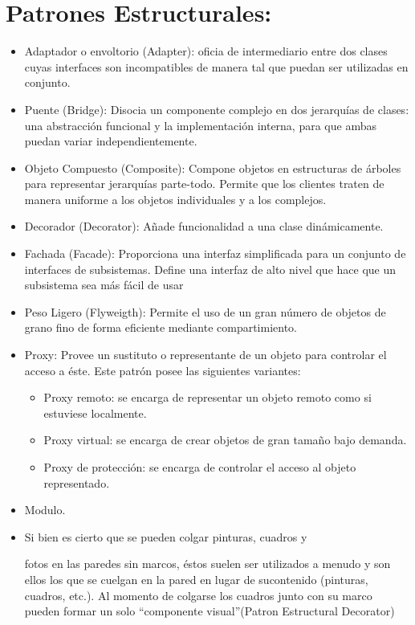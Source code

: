 \documentclass[10pt]{article}
\begin{document}
\section{Patrones Estructurales:}
\begin{itemize}


\item Adaptador o envoltorio (Adapter): oficia de intermediario entre dos clases cuyas interfaces 
son incompatibles de manera tal que puedan ser utilizadas en 
conjunto. 
\item Puente (Bridge): Disocia un componente complejo en dos jerarquías de 
clases: una abstracción funcional y la implementación interna, para 
que ambas puedan variar independientemente.
\item Objeto Compuesto (Composite): Compone objetos en estructuras de árboles para 
representar jerarquías parte-todo. Permite que los clientes traten de 
manera uniforme a los objetos individuales y a los complejos. 
\item Decorador (Decorator): Añade funcionalidad a una clase dinámicamente.
\item Fachada (Facade): Proporciona una interfaz simplificada para un conjunto de 
interfaces de subsistemas. Define una interfaz de alto nivel que 
hace que un subsistema sea más fácil de usar
\item Peso Ligero (Flyweigth): Permite el uso de un gran número de objetos de grano 
fino de forma eficiente mediante compartimiento.
\item Proxy: Provee un sustituto o representante de un objeto para 
controlar el acceso a éste. Este patrón posee las siguientes variantes:
\begin{itemize} 
\item Proxy remoto: se encarga de representar un objeto remoto 
como si estuviese localmente. 
\item Proxy virtual: se encarga de crear objetos de gran tamaño bajo 
demanda. 
\item Proxy de protección: se encarga de controlar el acceso al objeto 
representado.
\end{itemize}

\item Modulo.

\end{itemize}
\newpage
\begin{itemize}

\section{Ejemplo Cotidiano}
\item Si bien es cierto que se pueden colgar pinturas, cuadros y

 fotos en las paredes sin marcos, éstos suelen ser utilizados a
  menudo y son ellos los que se cuelgan en la pared en lugar de sucontenido (pinturas, cuadros, etc.). Al momento de colgarse los
 cuadros junto con su marco pueden formar un solo “componente visual”(Patron Estructural Decorator)
\end{itemize}
\end{document}
